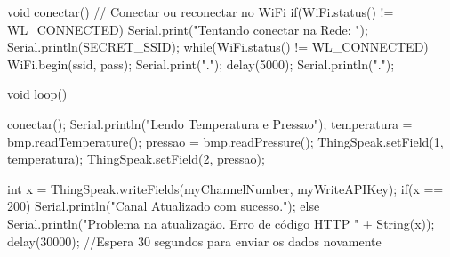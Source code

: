 void conectar(){
    // Conectar ou reconectar no WiFi
  if(WiFi.status() != WL_CONNECTED){
    Serial.print("Tentando conectar na Rede: ");
    Serial.println(SECRET_SSID);
    while(WiFi.status() != WL_CONNECTED){
      WiFi.begin(ssid, pass);  
      Serial.print(".");
      delay(5000);     
    } 
    Serial.println("\nConectado.");
  }
}

void loop() {
  conectar();
  Serial.println("Lendo Temperatura e Pressao");
  temperatura = bmp.readTemperature();
  pressao = bmp.readPressure();
  ThingSpeak.setField(1, temperatura);
  ThingSpeak.setField(2, pressao);
  
  int x = ThingSpeak.writeFields(myChannelNumber, myWriteAPIKey);
  if(x == 200){
    Serial.println("Canal Atualizado com sucesso.");
  }
  else{
    Serial.println("Problema na atualização. Erro de código HTTP " + String(x));
  }
  delay(30000); //Espera 30 segundos para enviar os dados novamente
}